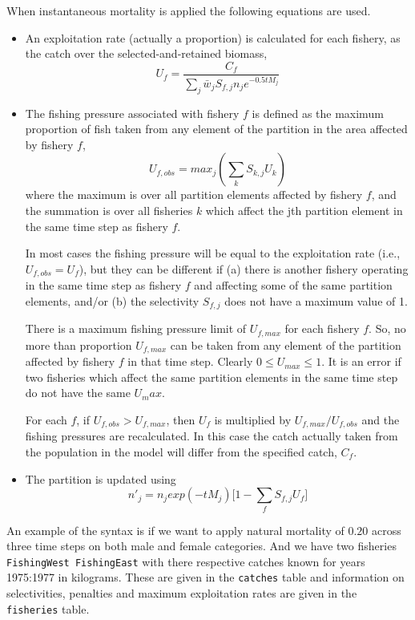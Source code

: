 When instantaneous mortality is applied the following equations are used.

\begin{itemize}
	\item An exploitation rate (actually a proportion) is calculated for each fishery, as the catch over the selected-and-retained biomass,
	$$ U_f = \frac{C_f}{\sum_j \bar{w}_jS_{f,j}n_j e^{-0.5tM_j}}$$
	\item The fishing pressure associated with fishery $f$ is defined as the maximum proportion of fish taken from any element of the partition in the area affected by fishery $f$,
	$$ U_{f,obs} = max_j(\sum_k S_{k,j}U_k) $$
	where the maximum is over all partition elements affected by fishery $f$, and the summation is over all fisheries $k$ which affect the jth partition element in the same time step as fishery $f$.
	
In most cases the fishing pressure will be equal to the exploitation rate (i.e., $U_{f,obs} = U_f$), but they can be different if (a) there is another fishery operating in the same time step as fishery $f$ and affecting some of the same partition elements, and/or (b) the selectivity $S_{f,j}$ does not have a maximum value of 1.
	
There is a maximum fishing pressure limit of $U_{f,max}$ for each fishery $f$. So, no more than proportion $U_{f,max}$ can be taken from any element of the partition affected by fishery $f$ in that time step. Clearly $0 \leq U_{max} \leq 1$. It is an error if two fisheries which affect the same partition elements in the same time step do not have the same $U_max$.

For each $f$, if $U_{f,obs} > U_{f,max}$, then $U_f$ is multiplied by $U_{f,max}/U_{f,obs}$ and the fishing pressures are recalculated. In this case the catch actually taken from the population in the model will differ from the specified catch, $C_f$.
	
\item The partition is updated using
	$$ n'_j = n_j exp(-tM_j)\big[1 - \sum_f S_{f,j} U_f \big] $$ 
\end{itemize}

An example of the syntax is if we want to apply natural mortality of $0.20$ across three time steps on both male and female categories. And we have two fisheries \texttt{FishingWest FishingEast} with there respective catches known for years 1975:1977 in kilograms. These are given in the \texttt{catches} table and information on selectivities, penalties and maximum exploitation rates are given in the \texttt{fisheries} table.

